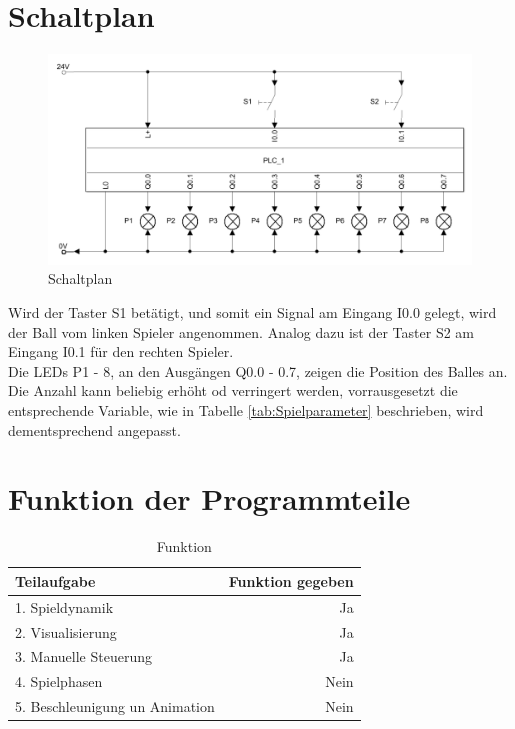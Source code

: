 \documentclass[a4paper]{article}
\begin{document}
    \section{Schaltplan}    %
    
     \begin{figure}[H]
         \includegraphics[width=\linewidth]{Image/Schaltplan.PNG}
         \caption{Schaltplan}
     \end{figure}

     Wird der Taster S1 betätigt, und somit ein Signal am Eingang I0.0 gelegt, wird der Ball vom linken Spieler angenommen. Analog dazu ist der Taster S2 am Eingang I0.1 für den rechten Spieler.\\
     Die LEDs P1 - 8, an den Ausgängen Q0.0 - 0.7, zeigen die Position des Balles an. Die Anzahl kann beliebig erhöht od verringert werden, vorrausgesetzt die entsprechende Variable, wie in Tabelle \ref{tab:Spielparameter} beschrieben, wird dementsprechend angepasst. 

    \section{Funktion der Programmteile} %
    \begin{table}[h!]
        \begin{center}
          \begin{tabular}{|l|r|}
         \hline 
            \textbf{Teilaufgabe} & \textbf{Funktion gegeben}\\
            \hline
            1. Spieldynamik & Ja\\
            \hline
            2. Visualisierung & Ja\\
            \hline
            3. Manuelle Steuerung & Ja\\
            \hline
            4. Spielphasen & Nein\\
            \hline
            5. Beschleunigung un Animation & Nein\\
            \hline
          \end{tabular}
          \caption{Funktion}
          \label{tab:Funktion}
        \end{center}
      \end{table}
\end{document}
